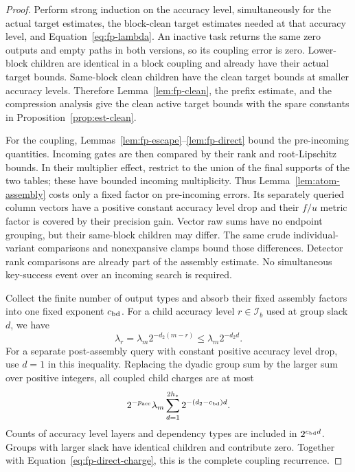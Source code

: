 \documentclass[11pt]{article}
\numberwithin{equation}{section}
\theoremstyle{definition}
\theoremstyle{remark}
\begin{document}
\begin{proof}
Perform strong induction on the accuracy level, simultaneously for
the actual target estimates, the block-clean target estimates needed at
that accuracy level, and Equation~\eqref{eq:fp-lambda}.  An inactive task returns
the same zero outputs and empty paths in both versions, so its coupling
error is zero.  Lower-block children are identical in a block coupling
and already have their actual target bounds.  Same-block clean children
have the clean target bounds at smaller accuracy levels.  Therefore
Lemma~\ref{lem:fp-clean}, the prefix estimate, and the compression
analysis give the clean active target bounds with the spare constants
in Proposition~\ref{prop:est-clean}.

For the coupling, Lemmas~\ref{lem:fp-escape}--\ref{lem:fp-direct}
bound the pre-incoming quantities.  Incoming gates are then compared
by their rank and root-Lipschitz bounds.  In their multiplier effect,
restrict to the union of the final supports of the two tables; these
have bounded incoming multiplicity.  Thus Lemma~\ref{lem:atom-assembly}
costs only a fixed factor on pre-incoming errors.  Its separately queried
column vectors have a positive constant accuracy level drop and their
$f/u$ metric factor is covered by their precision gain.  Vector raw
sums have no endpoint grouping, but their same-block children may
differ.  The same crude individual-variant comparisons and nonexpansive
clamps bound those differences.  Detector rank comparisons are already
part of the assembly estimate.  No simultaneous key-success event over
an incoming search is required.

Collect the finite number of output types and absorb their fixed
assembly factors into one fixed exponent ${c_{\rm bd}}$.  For a child accuracy level
${r}\in\mathcal I_b$ used at group slack $d$, we have
\begin{equation}
 \lambda_{r}=\lambda_{m}2^{-{d}_2({m}-{r})}
              \le\lambda_{m}2^{-{d}_2d}.
 \label{eq:fp-child-gain}
\end{equation}
For a separate post-assembly query with constant positive accuracy level drop,
use $d=1$ in this inequality.  Replacing the dyadic group sum by the
larger sum over positive integers, all coupled child charges are at most
\begin{equation}
 2^{-{p_{\rm acc}}}\lambda_{m}\sum_{d=1}^{2h_*}2^{-({d}_2-{c_{\rm bd}})d}.
 \label{eq:fp-recurrence}
\end{equation}
Counts of accuracy level layers and dependency types are included in $2^{{c_{\rm bd}} d}$.
Groups with larger slack have identical children and contribute zero.
Together with Equation~\eqref{eq:fp-direct-charge}, this is the complete
coupling recurrence.


\end{proof}
\end{document}
